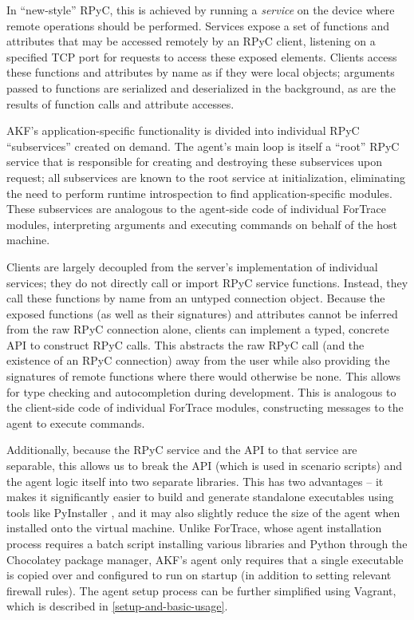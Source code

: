 \documentclass[letterpaper,12pt]{report}
\begin{document}
In ``new-style'' RPyC, this is achieved by running a \emph{service} on
the device where remote operations should be performed. Services expose
a set of functions and attributes that may be accessed remotely by an
RPyC client, listening on a specified TCP port for requests to access
these exposed elements. Clients access these functions and attributes by
name as if they were local objects; arguments passed to functions are
serialized and deserialized in the background, as are the results of
function calls and attribute accesses.

AKF's application-specific functionality is divided into individual RPyC
``subservices'' created on demand. The agent's main loop is itself a
``root'' RPyC service that is responsible for creating and destroying
these subservices upon request; all subservices are known to the root
service at initialization, eliminating the need to perform runtime
introspection to find application-specific modules. These subservices
are analogous to the agent-side code of individual ForTrace modules,
interpreting arguments and executing commands on behalf of the host
machine.

Clients are largely decoupled from the server's implementation of
individual services; they do not directly call or import RPyC service
functions. Instead, they call these functions by name from an untyped
connection object. Because the exposed functions (as well as their
signatures) and attributes cannot be inferred from the raw RPyC
connection alone, clients can implement a typed, concrete API to
construct RPyC calls. This abstracts the raw RPyC call (and the
existence of an RPyC connection) away from the user while also providing
the signatures of remote functions where there would otherwise be none.
This allows for type checking and autocompletion during development.
This is analogous to the client-side code of individual ForTrace
modules, constructing messages to the agent to execute commands.

Additionally, because the RPyC service and the API to that service are
separable, this allows us to break the API (which is used in scenario
scripts) and the agent logic itself into two separate libraries. This
has two advantages -- it makes it significantly easier to build and
generate standalone executables using tools like PyInstaller
\cite{PyinstallerPyinstaller2025}, and it may also slightly reduce
the size of the agent when installed onto the virtual machine. Unlike
ForTrace, whose agent installation process requires a batch script
installing various libraries and Python through the Chocolatey package
manager, AKF's agent only requires that a single executable is copied
over and configured to run on startup (in addition to setting relevant
firewall rules). The agent setup process can be further simplified using
Vagrant, which is described in \autoref{setup-and-basic-usage}.
\end{document}
